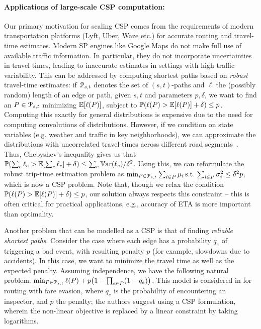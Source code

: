 \paragraph{Applications of large-scale CSP computation:}
Our primary motivation for scaling CSP comes from the requirements of modern transportation platforms (Lyft, Uber, Waze etc.) for accurate routing and travel-time estimates.
Modern SP engines like Google Maps do not make full use of available traffic information.
In particular, they do not incorporate uncertainties in travel times, leading to inaccurate estimates in settings with high traffic variability.
This can be addressed by computing shortest paths based on \emph{robust} travel-time estimates:
if $\mathcal{P}_{s,t}$ denotes the set of $(s,t)$-paths and $\ell$ the (possibly random) length of an edge or path, given $s,t$ and parameters $p,\delta$, we want to find an $P\in\mathcal{P}_{s,t}$ minimizing $\mathbb{E}[\ell(P)]$, subject to $\mathbb{P}(\ell(P)>\mathbb{E}[\ell(P)]+\delta)\leq p$.
Computing this exactly for general distributions is expensive due to the need for computing convolutions of distributions. 
However, if we condition on state variables (e.g. weather and traffic in key neighborhoods),  we can approximate the distributions with uncorrelated travel-times across different road segments~\citep{woodard2017predicting}. 
Thus, Chebyshev's inequality gives us that $\mathbb{P}(\sum_e\ell_e>\mathbb{E}[\sum_e\ell_e]+\delta)\leq \sum_e\mathbb{V}\textnormal{ar}(\ell_e)/\delta^2$. 
Using this, we can reformulate the robust trip-time estimation problem as 
$\min_{ P\in\mathcal{P}_{s,t}}\sum_{i\in P}\mu_i \, \mbox{s.t.}\, \sum_{i\in P}\sigma^2_i\leq \delta^2p$, which is now a CSP problem. 
Note that, though we relax the condition $\mathbb{P}(\ell(P)>\mathbb{E}[\ell(P)]+\delta)\leq p$, our solution always respects this constraint -- this is often critical for practical applications, e.g., accuracy of ETA is more important than optimality.

Another problem that can be modelled as a CSP is that of finding \emph{reliable shortest paths}.
Consider the case where each edge has a probability $q_e$ of triggering a bad event, with resulting penalty $p$ (for example, slowdowns due to accidents).
In this case, we want to minimize the travel time as well as the expected penalty.
Assuming independence, we have the following natural problem:
$\min_{P\in\Pst} \ell(P)+p\prn*{1-\prod_{e\in P}(1-q_e)}$.
This model is considered in \citep{fareevasion} for routing with fare evasion, where $q_e$ is the probability of encountering an inspector, and $p$ the penalty; the authors suggest using a CSP formulation, wherein the non-linear objective is replaced by a linear constraint by taking logarithms.


